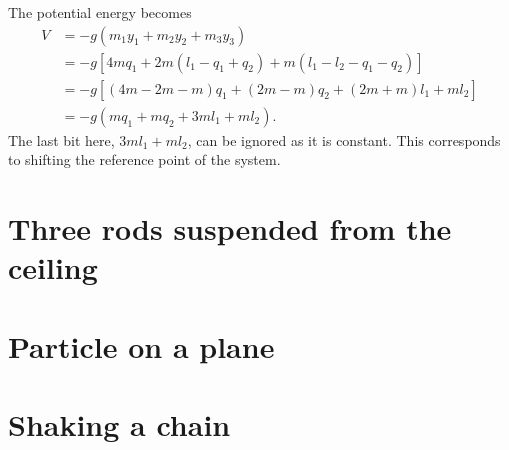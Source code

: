 \documentclass[11pt]{amsart}
\begin{document}
The potential energy becomes
\begin{align*}
V 	&= -g( m_1y_1 + m_2y_2 + m_3y_3 ) \\
	&= -g[ 4mq_1 + 2m(l_1 - q_1 + q_2) + m(l_1 - l_2 - q_1 - q_2)] \\
	&= -g[ (4m - 2m - m)q_1 + (2m - m)q_2 + (2m + m)l_1 + ml_2 ] \\ 
	&= -g( mq_1 + mq_2 + 3ml_1 + ml_2 ).
\end{align*}
The last bit here, $3ml_1 + ml_2$, can be ignored as it is constant. This corresponds to shifting the reference point of the system.

\section{Three rods suspended from the ceiling}

\section{Particle on a plane}

\section{Shaking a chain}
\end{document}
